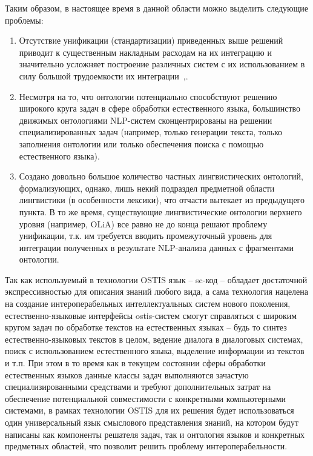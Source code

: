 Таким образом, в настоящее время в данной области можно выделить следующие проблемы:
\begin{enumerate}
    \item Отсутствие унификации (стандартизации) приведенных выше решений приводит к существенным накладным расходам на их интеграцию и значительно усложняет построение различных систем с их использованием в силу большой трудоемкости их интеграции~\cite{Standard2021},\cite{GolenkovProblems2021}.
    \item Несмотря на то, что онтологии потенциально способствуют решению широкого круга задач в сфере обработки естественного языка, большинство движимых онтологиями NLP-систем сконцентрированы на решении специализированных задач (например, только генерации текста, только заполнения онтологии или только обеспечения поиска с помощью естественного языка).
    \item Создано довольно большое количество частных лингвистических онтологий, формализующих, однако, лишь некий подраздел предметной области лингвистики (в особенности лексики), что отчасти вытекает из предыдущего пункта. В то же время, существующие лингвистические онтологии верхнего уровня (например, OLiA) все равно не до конца решают проблему унификации, т.к. им требуется вводить промежуточный уровень для интеграции полученных в результате NLP-анализа данных с фрагментами онтологии.
\end{enumerate}

Так как используемый в технологии OSTIS язык -- sc-код -- обладает достаточной экспрессивностью для описания знаний любого вида, а сама технология нацелена на создание интероперабельных интеллектуальных систем нового поколения, естественно-языковые интерфейсы ostis-систем смогут справляться с широким кругом задач по обработке текстов на естественных языках -- будь то синтез естественно-языковых текстов в целом, ведение диалога в диалоговых системах, поиск с использованием естественного языка, выделение информации из текстов и т.п. При этом в то время как в текущем состоянии сферы обработки естественных языков данные классы задач выполняются зачастую специализированными средствами и требуют дополнительных затрат на обеспечение потенциальной совместимости с конкретными компьютерными системами, в рамках технологии OSTIS для их решения будет использоваться один универсальный язык смыслового представления знаний, на котором будут написаны как компоненты решателя задач, так и онтология языков и конкретных предметных областей, что позволит решить проблему интероперабельности.

